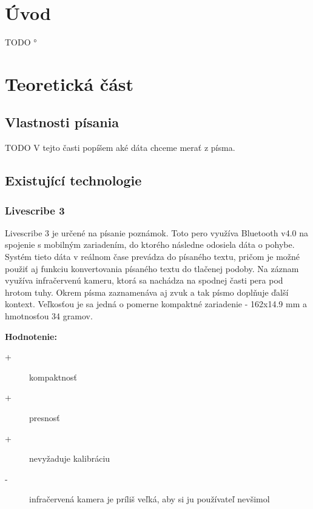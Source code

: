 \chapter{Úvod}

TODO
°
\chapter{Teoretická část}

\section{Vlastnosti písania}

TODO
V tejto časti popíšem aké dáta chceme merať z písma.

\section{Existující technologie}

\subsection*{Livescribe 3}

Livescribe 3 je určené na písanie poznámok. Toto pero využíva Bluetooth v4.0 na spojenie s mobilným zariadením, do ktorého následne odosiela dáta o pohybe. Systém tieto dáta v reálnom čase prevádza do písaného textu, pričom je možné použiť aj funkciu konvertovania písaného textu do tlačenej podoby. Na záznam využíva infračervenú kameru, ktorá sa nachádza na spodnej časti pera pod hrotom tuhy. Okrem písma zaznamenáva aj zvuk a tak písmo doplňuje ďalší kontext. Veľkosťou je sa jedná o pomerne kompaktné zariadenie - 162x14.9 mm a hmotnosťou 34 gramov.\newline

\textbf{Hodnotenie:}
\begin{description}
	\item[+]{kompaktnosť}
	\item[+]{presnosť}
	\item[+]{nevyžaduje kalibráciu}
	\item[-]{infračervená kamera je príliš veľká, aby si ju používateľ nevšimol}
\end{description}

